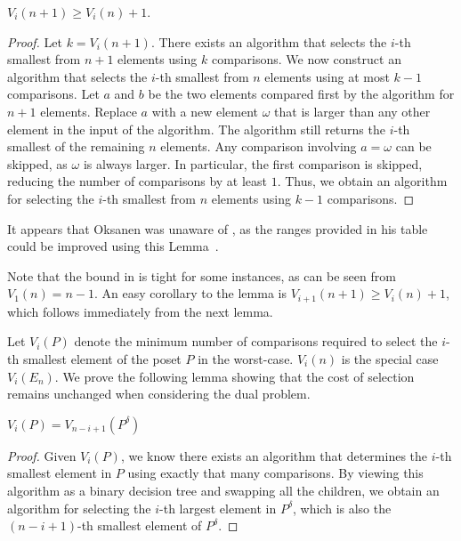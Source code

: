 \documentclass[a4paper,UKenglish,cleveref, autoref, thm-restate]{lipics-v2021}
\newcommand{\dual}[1]{{#1}^{\delta}}
\begin{document}
\begin{lemma} \label{lemma:previous_next_poset}
  $V_i(n + 1) \geq V_i(n) + 1$.
\end{lemma}

\begin{proof}
  Let $k = V_i(n + 1)$.
  There exists an algorithm that selects the $i$-th smallest from $n + 1$ elements using $k$ comparisons.
  We now construct an algorithm that selects the $i$-th smallest from $n$ elements using at most $k - 1$ comparisons.
  Let $a$ and $b$ be the two elements compared first by the algorithm for $n + 1$ elements.
  Replace $a$ with a new element $\omega$ that is larger than any other element in the input of the algorithm.
  The algorithm still returns the $i$-th smallest of the remaining $n$ elements.
  Any comparison involving $a = \omega$ can be skipped, as $\omega$ is always larger.
  In particular, the first comparison is skipped, reducing the number of comparisons by at least $1$.
  Thus, we obtain an algorithm for selecting the $i$-th smallest from $n$ elements using $k - 1$ comparisons.
\end{proof}

\begin{remark}
  It appears that Oksanen was unaware of , as the ranges provided in his table could be improved using this Lemma~\cite{Oksanen}.
\end{remark}

Note that the bound in  is tight for some instances, as can be seen from $V_1(n) = n - 1$.
An easy corollary to the lemma is $V_{i + 1}(n + 1) \geq V_i(n) + 1$, which follows immediately from the next lemma.

Let $V_i(P)$ denote the minimum number of comparisons required to select the $i$-th smallest element of the poset $P$ in the worst-case.
$V_i(n)$ is the special case $V_i(E_n)$.
We prove the following lemma showing that the cost of selection remains unchanged when considering the dual problem.

\begin{lemma} \label{lemma:dual_poset_allowed}
  $V_i(P) = V_{n - i + 1}(\dual{P})$
\end{lemma}

\begin{proof}
  Given $V_i(P)$, we know there exists an algorithm that determines the $i$-th smallest element in $P$ using exactly that many comparisons.
  By viewing this algorithm as a binary decision tree and swapping all the children, we obtain an algorithm for selecting the $i$-th largest element in $\dual{P}$, which is also the $(n - i + 1)$-th smallest element of $\dual{P}$.
\end{proof}
\end{document}
